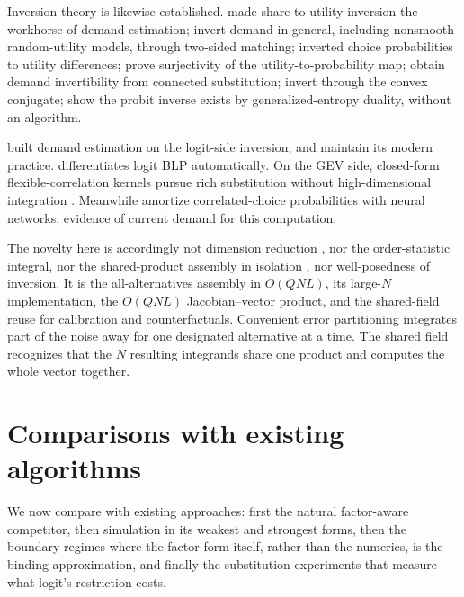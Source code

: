 \documentclass[12pt]{article}
\theoremstyle{remark}
\begin{document}
Inversion theory is likewise established. \citet{berry1994} made
share-to-utility inversion the workhorse of demand estimation;
\citet{bonnet2022} invert demand in general, including nonsmooth
random-utility models, through two-sided matching;
\citet{hotz1993}
inverted choice probabilities to utility differences; \citet{norets2013}
prove surjectivity of the utility-to-probability map;
\citet{bgh2013} obtain demand invertibility from
connected substitution;
\citet{chiong2016} invert through the convex
conjugate; \citet{fosgerau2020} show the probit inverse exists by
generalized-entropy duality, without an algorithm.

 \citet{berry1995} built demand
estimation on the logit-side inversion, and \citet{conlon2020}
maintain its modern practice. \citet{chia2021}
differentiates logit BLP automatically. On the GEV side, closed-form
flexible-correlation kernels pursue rich substitution without
high-dimensional integration \citep{tinessa2020,tinessa2021}.
Meanwhile \citet{huch2026}
amortize correlated-choice probabilities with neural networks, evidence of
current demand for this computation.

The novelty here is accordingly not dimension reduction
\citep{curnow1962}, nor the order-statistic integral, nor the
shared-product assembly in isolation \citep{mahani2019,cotton2021}, nor
well-posedness of inversion. It is the
all-alternatives assembly in $O(QNL)$, its large-$N$ implementation, the
$O(QNL)$ Jacobian--vector product, and the shared-field reuse for
calibration and counterfactuals. Convenient error partitioning
\citep{train1995} integrates part of the noise away for one designated
alternative at a time. The shared field recognizes that the $N$
resulting integrands share one product and computes the whole vector
together.

\section{Comparisons with existing algorithms}\label{sec:comparisons}
\label{sec:boundary}

We now compare with existing approaches: first the natural
factor-aware competitor, then simulation in its weakest and strongest
forms, then the boundary regimes where the factor form itself, rather
than the numerics, is the binding approximation, and finally the
substitution experiments that measure what logit's restriction costs.
\end{document}
